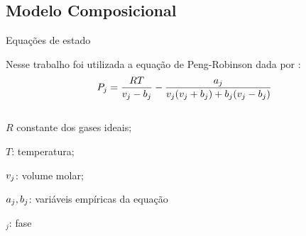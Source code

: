 \documentclass[professionalfont]{beamer}
\begin{document}
\subsection{Modelo Composicional}
\begin{frame}{Equações de estado}



    
    Nesse trabalho foi utilizada a equação de Peng-Robinson dada por \cite{Chen2007}:
    \begin{equation}
        \label{eq:eos.1}
        P_{j} = \dfrac{R T}{v_{j} - b_{j}} - \dfrac{a_{j}}{v_{j}(v_{j} + b_{j}) + b_{j}(v_{j} - b_{j})}
    \end{equation}
    \begin{columns}
        \begin{column}{0.6\textwidth}
            \begin{description}[]
                \item $R$ constante dos gases ideais;
                \item $T$: temperatura;
                \item $v_{j}$: volume molar;
                \item $a_{j}, b_{j}$: variáveis empíricas da equação
                \item $_{j}$: fase
            \end{description}
        \end{column}
    \end{columns}
    
\end{frame}
\end{document}
